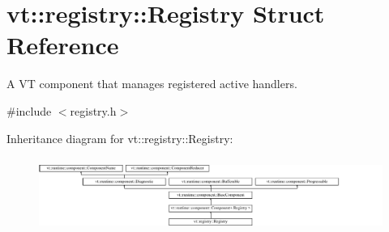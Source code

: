 \hypertarget{structvt_1_1registry_1_1_registry}{}\section{vt\+:\+:registry\+:\+:Registry Struct Reference}
\label{structvt_1_1registry_1_1_registry}


A VT component that manages registered active handlers.  




{\ttfamily \#include $<$registry.\+h$>$}

Inheritance diagram for vt\+:\+:registry\+:\+:Registry\+:\begin{figure}[H]
\begin{center}
\leavevmode
\includegraphics[height=2.473498cm]{structvt_1_1registry_1_1_registry}
\end{center}
\end{figure}
